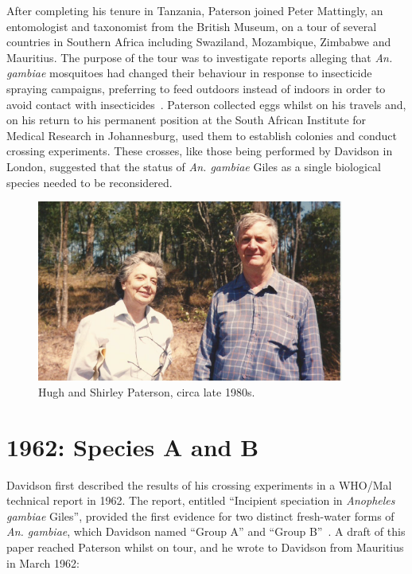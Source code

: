 \begin{refsection}
After completing his tenure in Tanzania, Paterson joined Peter Mattingly, an entomologist and taxonomist from the British Museum, on a tour of several countries in Southern Africa including Swaziland, Mozambique, Zimbabwe and Mauritius.
%
The purpose of the tour was to investigate reports alleging that \textit{An. gambiae} mosquitoes had changed their behaviour in response to insecticide spraying campaigns, preferring to feed outdoors instead of indoors in order to avoid contact with insecticides~\parencite{Mattingly1963}.
%
Paterson collected eggs whilst on his travels and, on his return to his permanent position at the South African Institute for Medical Research in Johannesburg, used them to establish colonies and conduct crossing experiments.
%
These crosses, like those being performed by Davidson in London, suggested that the status of \textit{An. gambiae} Giles as a single biological species needed to be reconsidered.


\begin{figure}[t]
\centering
\includegraphics[width=0.9\textwidth]{artwork/chapter2/Hugh_and_Shirley_Paterson_Brisbane.jpg}
\caption{Hugh and Shirley Paterson, circa late 1980s.}
\label{fig:patersons}
\end{figure}


\section{1962: Species A and B}\label{sec:1962}


Davidson first described the results of his crossing experiments in a WHO/Mal technical report in 1962.
%
The report, entitled ``Incipient speciation in \textit{Anopheles gambiae} Giles'', 
provided the first evidence for two distinct fresh-water forms of \textit{An. gambiae}, which Davidson named ``Group A'' and ``Group B''~\parencite{Davidson1962a}.
%
A draft of this paper reached Paterson whilst on tour, and he wrote to Davidson from Mauritius in March 1962:



\end{refsection}
